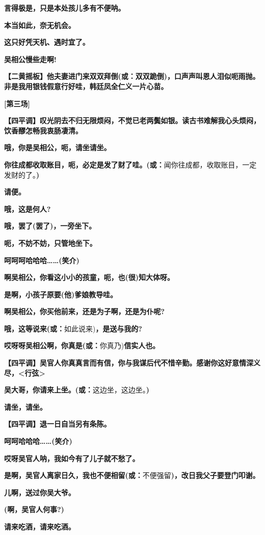\textbf{言得极是，只是本处孩儿多有不便呐。}

\textbf{本当如此，奈无机会。}

\textbf{这只好凭天机、遇时宜了。}

\textbf{吴相公慢些走啊!}

\textbf{【二黄摇板】他夫妻进门来双双拜倒(或：双双跪倒)，口声声叫恩人泪似呃雨抛。非是我用银钱假意行好哇，韩廷凤全仁义一片心苗。}

\textbf{{[}第三场{]}}

\textbf{【四平调】叹光阴去不归无限烦闷，不觉已老两鬓如银。读古书难解我心头烦闷，饮香醪怎畅我衷肠凄清。}

\textbf{哦，你是吴相公，呃，请坐请坐。}

\textbf{你往成都收取账目，呃，必定是发了财了哇。(或：}闻你往成都，收取账目，一定发财的了。\textbf{)}

\textbf{请便。}

\textbf{哦，这是何人?}

\textbf{哦，罢了(罢了)，一旁坐下。}

\textbf{呃，不妨不妨，只管地坐下。}

\textbf{呵呵呵哈哈哈\ldots{}\ldots{}(笑介)}

\textbf{啊吴相公，你看这小小的孩童，呃，也(很)知大体呀。}

\textbf{是啊，小孩子原要(他)爹娘教导哇。}

\textbf{啊吴相公，你买他前来，还是为子啊，还是为仆呢?}

\textbf{哦，这等说来(或：}如此说来)\textbf{，是送与我的?}

\textbf{哎呀呀吴相公啊，你真是(或：}你真乃)\textbf{信实人也。}

\textbf{【四平调】吴官人你真真言而有信，你与我谋后代不惜辛勤。感谢你这好意情深义尽，\textless{}行弦\textgreater{}}

\textbf{吴大哥，你请来上坐。(或：}这边坐，这边坐。\textbf{)}

\textbf{请坐，请坐。}

\textbf{【四平调】退一日自当另有条陈。}

\textbf{呵呵哈哈哈\ldots{}\ldots{}(笑介)}

\textbf{哎呀吴官人呐，我如今有了儿子就不愁了。}

\textbf{是啊，吴官人离家日久，我也不便相留(或：}不便强留\textbf{)，改日我父子要登门叩谢。}

\textbf{儿啊，送过你吴大爷。}

\textbf{(啊，吴官人何事?)}

\textbf{请来吃酒，请来吃酒。}

